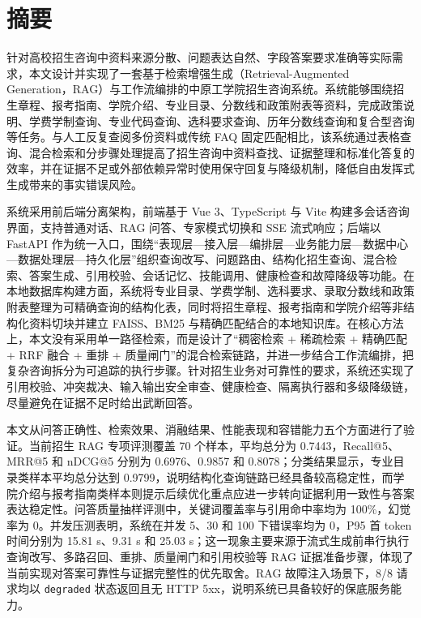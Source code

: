 \documentclass[UTF8,zihao=-4,oneside]{ctexbook}
\numberwithin{equation}{chapter}
\begin{document}
\clearpage
{}
\setcounter{page}{1}
\pagestyle{thesisfront}

\chapter*{摘\quad 要}
针对高校招生咨询中资料来源分散、问题表达自然、字段答案要求准确等实际需求，本文设计并实现了一套基于检索增强生成（Retrieval-Augmented Generation，RAG）与工作流编排的中原工学院招生咨询系统。系统能够围绕招生章程、报考指南、学院介绍、专业目录、分数线和政策附表等资料，完成政策说明、学费学制查询、专业代码查询、选科要求查询、历年分数线查询和复合型咨询等任务。与人工反复查阅多份资料或传统 FAQ 固定匹配相比，该系统通过表格查询、混合检索和分步骤处理提高了招生咨询中资料查找、证据整理和标准化答复的效率，并在证据不足或外部依赖异常时使用保守回复与降级机制，降低自由发挥式生成带来的事实错误风险。

系统采用前后端分离架构，前端基于 Vue 3、TypeScript 与 Vite 构建多会话咨询界面，支持普通对话、RAG 问答、专家模式切换和 SSE 流式响应；后端以 FastAPI 作为统一入口，围绕“表现层—接入层—编排层—业务能力层—数据中心—数据处理层—持久化层”组织查询改写、问题路由、结构化招生查询、混合检索、答案生成、引用校验、会话记忆、技能调用、健康检查和故障降级等功能。在本地数据库构建方面，系统将专业目录、学费学制、选科要求、录取分数线和政策附表整理为可精确查询的结构化表，同时将招生章程、报考指南和学院介绍等非结构化资料切块并建立 FAISS、BM25 与精确匹配结合的本地知识库。在核心方法上，本文没有采用单一路径检索，而是设计了“稠密检索 + 稀疏检索 + 精确匹配 + RRF 融合 + 重排 + 质量闸门”的混合检索链路，并进一步结合工作流编排，把复杂咨询拆分为可追踪的执行步骤。针对招生业务对可靠性的要求，系统还实现了引用校验、冲突裁决、输入输出安全审查、健康检查、隔离执行器和多级降级链，尽量避免在证据不足时给出武断回答。

本文从问答正确性、检索效果、消融结果、性能表现和容错能力五个方面进行了验证。当前招生 RAG 专项评测覆盖 70 个样本，平均总分为 0.7443，Recall@5、MRR@5 和 nDCG@5 分别为 0.6976、0.9857 和 0.8078；分类结果显示，专业目录类样本平均总分达到 0.9799，说明结构化查询链路已经具备较高稳定性，而学院介绍与报考指南类样本则提示后续优化重点应进一步转向证据利用一致性与答案表达稳定性。问答质量抽样评测中，关键词覆盖率与引用命中率均为 100\%，幻觉率为 0。并发压测表明，系统在并发 5、30 和 100 下错误率均为 0，P95 首 token 时间分别为 15.81 s、9.31 s 和 25.03 s；这一现象主要来源于流式生成前串行执行查询改写、多路召回、重排、质量闸门和引用校验等 RAG 证据准备步骤，体现了当前实现对答案可靠性与证据完整性的优先取舍。RAG 故障注入场景下，8/8 请求均以 \texttt{degraded} 状态返回且无 HTTP 5xx，说明系统已具备较好的保底服务能力。
\end{document}
